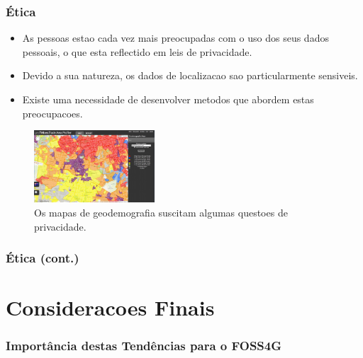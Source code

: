 \documentclass[hyperref={pdfpagelabels=true}]{beamer}
\begin{document}
\begin{frame}
\frametitle{\'{E}tica}

    \begin{itemize}
        \item<2->As pessoas estao cada vez mais preocupadas com o uso dos seus dados pessoais, o que esta reflectido em leis de privacidade.
        \item<3->Devido a sua natureza, os dados de localizacao sao particularmente sensiveis.
        \item<4->Existe uma necessidade de desenvolver metodos que abordem estas preocupacoes.
    \end{itemize}                      
    
        \begin{figure}   
            \includegraphics[width=0.4\textwidth]{geodemographics.jpg}\\
            \tiny{Os mapas de geodemografia suscitam algumas questoes de privacidade.}%
        \end{figure} 

\end{frame}

\begin{frame}
\frametitle{\'{E}tica (cont.)}


\end{frame}


\section{Consideracoes Finais} 

\begin{frame}
\frametitle{Import\^{a}ncia destas Tend\^{e}ncias para o FOSS4G}





\end{frame}
\end{document}
